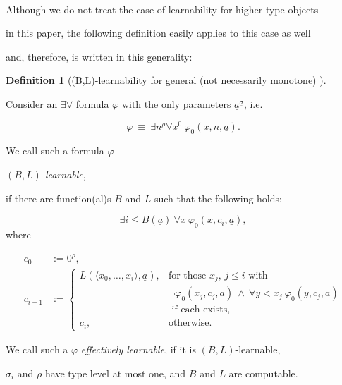 \documentclass[1p]{elsarticle}
\newcommand{\tup}{\underline} %
\newcommand{\Telse}{\text{otherwise}}
\theoremstyle{plain}
\theoremstyle{definition}
\newtheorem{dfn}[thm]{Definition}
\theoremstyle{remark}
\renewcommand{\phi}{\varphi}
\theoremstyle{definition}
\begin{document}


\\[1mm] 

Although we do not treat the case of learnability for higher type objects 

in this paper, the following definition easily applies to this case as well 

and, therefore, is written in this generality:

\begin{dfn}[(B,L)-learnability for general (not necessarily monotone) 

formulas]\label{d:fmcNum}

Consider an $\exists\forall$ formula $\phi$ with the only parameters $\tup a^{\tup \sigma}$, i.e.

\[\phi\ \equiv\ \exists n^\rho \forall x^0\ \phi_0(x,n,\tup a).\]

We call such a formula $\phi$ 

{\em $(B,L)$-learnable},

if there are function(al)s $B$ and $L$ such that the following holds:

\[ \exists i\leq B(\tup a)\ \forall x\ \phi_0(x,c_i,\tup a),\] where

\begin{align*}

c_0&:=0^{\rho},\\

c_{i+1}&:=

\begin{cases}

L(\langle x_0,\ldots,x_i\rangle, \tup a), &\text{for those $x_j$, $j\leq i$ with }\\

 &\neg\phi_0(x_j,c_j,\tup a)\ \wedge\ \forall y<x_j\ \phi_0(y,c_j,\tup a)\\

  &\text{ if each exists},\\

c_i, &\Telse.

\end{cases}

\end{align*}

We call such a $\phi$ {\em effectively learnable}, if it is $(B,L)$-learnable,

$\sigma_i$ and $\rho$ have type level at most one, and $B$ and $L$ are computable.

\end{dfn}
\end{document}
